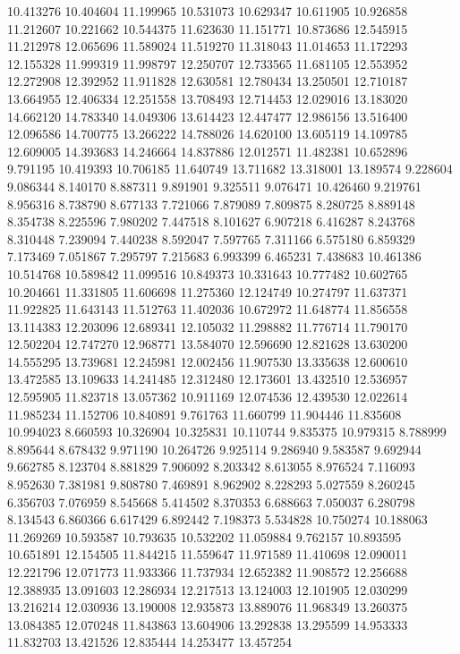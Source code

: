 10.413276
10.404604
11.199965
10.531073
10.629347
10.611905
10.926858
11.212607
10.221662
10.544375
11.623630
11.151771
10.873686
12.545915
11.212978
12.065696
11.589024
11.519270
11.318043
11.014653
11.172293
12.155328
11.999319
11.998797
12.250707
12.733565
11.681105
12.553952
12.272908
12.392952
11.911828
12.630581
12.780434
13.250501
12.710187
13.664955
12.406334
12.251558
13.708493
12.714453
12.029016
13.183020
14.662120
14.783340
14.049306
13.614423
12.447477
12.986156
13.516400
12.096586
14.700775
13.266222
14.788026
14.620100
13.605119
14.109785
12.609005
14.393683
14.246664
14.837886
12.012571
11.482381
10.652896
9.791195
10.419393
10.706185
11.640749
13.711682
13.318001
13.189574
9.228604
9.086344
8.140170
8.887311
9.891901
9.325511
9.076471
10.426460
9.219761
8.956316
8.738790
8.677133
7.721066
7.879089
7.809875
8.280725
8.889148
8.354738
8.225596
7.980202
7.447518
8.101627
6.907218
6.416287
8.243768
8.310448
7.239094
7.440238
8.592047
7.597765
7.311166
6.575180
6.859329
7.173469
7.051867
7.295797
7.215683
6.993399
6.465231
7.438683
10.461386
10.514768
10.589842
11.099516
10.849373
10.331643
10.777482
10.602765
10.204661
11.331805
11.606698
11.275360
12.124749
10.274797
11.637371
11.922825
11.643143
11.512763
11.402036
10.672972
11.648774
11.856558
13.114383
12.203096
12.689341
12.105032
11.298882
11.776714
11.790170
12.502204
12.747270
12.968771
13.584070
12.596690
12.821628
13.630200
14.555295
13.739681
12.245981
12.002456
11.907530
13.335638
12.600610
13.472585
13.109633
14.241485
12.312480
12.173601
13.432510
12.536957
12.595905
11.823718
13.057362
10.911169
12.074536
12.439530
12.022614
11.985234
11.152706
10.840891
9.761763
11.660799
11.904446
11.835608
10.994023
8.660593
10.326904
10.325831
10.110744
9.835375
10.979315
8.788999
8.895644
8.678432
9.971190
10.264726
9.925114
9.286940
9.583587
9.692944
9.662785
8.123704
8.881829
7.906092
8.203342
8.613055
8.976524
7.116093
8.952630
7.381981
9.808780
7.469891
8.962902
8.228293
5.027559
8.260245
6.356703
7.076959
8.545668
5.414502
8.370353
6.688663
7.050037
6.280798
8.134543
6.860366
6.617429
6.892442
7.198373
5.534828
10.750274
10.188063
11.269269
10.593587
10.793635
10.532202
11.059884
9.762157
10.893595
10.651891
12.154505
11.844215
11.559647
11.971589
11.410698
12.090011
12.221796
12.071773
11.933366
11.737934
12.652382
11.908572
12.256688
12.388935
13.091603
12.286934
12.217513
13.124003
12.101905
12.030299
13.216214
12.030936
13.190008
12.935873
13.889076
11.968349
13.260375
13.084385
12.070248
11.843863
13.604906
13.292838
13.295599
14.953333
11.832703
13.421526
12.835444
14.253477
13.457254
